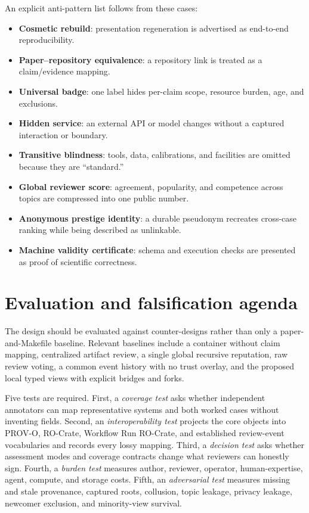 \documentclass[11pt]{article}
\begin{document}
An explicit anti-pattern list follows from these cases:

\begin{itemize}
  \item \textbf{Cosmetic rebuild}: presentation regeneration is advertised as end-to-end reproducibility.
  \item \textbf{Paper--repository equivalence}: a repository link is treated as a claim/evidence mapping.
  \item \textbf{Universal badge}: one label hides per-claim scope, resource burden, age, and exclusions.
  \item \textbf{Hidden service}: an external API or model changes without a captured interaction or boundary.
  \item \textbf{Transitive blindness}: tools, data, calibrations, and facilities are omitted because they are ``standard.''
  \item \textbf{Global reviewer score}: agreement, popularity, and competence across topics are compressed into one public number.
  \item \textbf{Anonymous prestige identity}: a durable pseudonym recreates cross-case ranking while being described as unlinkable.
  \item \textbf{Machine validity certificate}: schema and execution checks are presented as proof of scientific correctness.
\end{itemize}

\section{Evaluation and falsification agenda}
\label{sec:evaluation}

The design should be evaluated against counter-designs rather than only a paper-and-Makefile baseline. Relevant baselines include a container without claim mapping, centralized artifact review, a single global recursive reputation, raw review voting, a common event history with no trust overlay, and the proposed local typed views with explicit bridges and forks.

Five tests are required. First, a \emph{coverage test} asks whether independent annotators can map representative systems and both worked cases without inventing fields. Second, an \emph{interoperability test} projects the core objects into PROV-O, RO-Crate, Workflow Run RO-Crate, and established review-event vocabularies and records every lossy mapping. Third, a \emph{decision test} asks whether assessment modes and coverage contracts change what reviewers can honestly sign. Fourth, a \emph{burden test} measures author, reviewer, operator, human-expertise, agent, compute, and storage costs. Fifth, an \emph{adversarial test} measures missing and stale provenance, captured roots, collusion, topic leakage, privacy leakage, newcomer exclusion, and minority-view survival.
\end{document}
